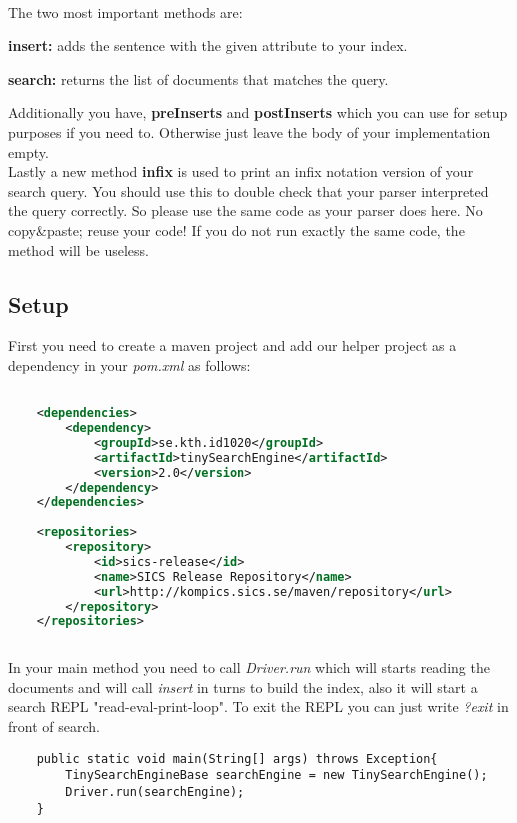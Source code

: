 \documentclass[11pt]{article}
\begin{document}
\paragraph{}
The two most important methods are:
\begin{description}
\item \textbf{insert:} adds the sentence with the given attribute to your index.
\item \textbf{search:} returns the list of documents that matches the query.
\end{description}
Additionally you have, \textbf{preInserts} and \textbf{postInserts} which you can use for setup purposes if you need to. Otherwise just leave the body of your implementation empty.\\
Lastly a new method \textbf{infix} is used to print an infix notation version of your search query. You should use this to double check that your parser interpreted the query correctly. So please use the same code as your parser does here. No copy\&paste; reuse your code! If you do not run exactly the same code, the method will be useless.

\subsection{Setup}
First you need to create a maven project and add our helper project as a dependency in your \textit{pom.xml} as follows:

\begin{lstlisting}[language=XML]

    <dependencies>
        <dependency>
            <groupId>se.kth.id1020</groupId>
            <artifactId>tinySearchEngine</artifactId>
            <version>2.0</version>
        </dependency>
    </dependencies>
    
    <repositories>
        <repository>
            <id>sics-release</id>
            <name>SICS Release Repository</name>
            <url>http://kompics.sics.se/maven/repository</url>
        </repository>
    </repositories>
    
\end{lstlisting}

In your main method you need to call \textit{Driver.run} which will starts reading the documents and will call \textit{insert} in turns to build the index, also it will start a  search REPL "read-eval-print-loop". To exit the REPL you can just write \textit{?exit} in front of search.

\begin{lstlisting}
    public static void main(String[] args) throws Exception{
        TinySearchEngineBase searchEngine = new TinySearchEngine();
        Driver.run(searchEngine);
    }
\end{lstlisting}
\end{document}
